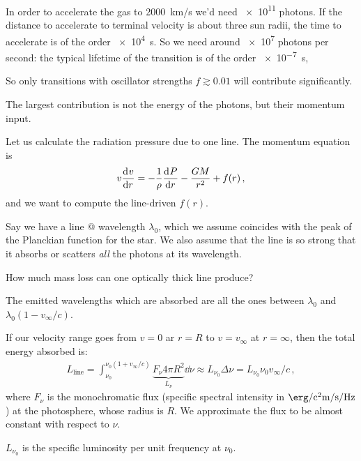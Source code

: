 \documentclass[main.tex]{subfiles}
\begin{document}
In order to accelerate the gas to \SI{2000}{km/s} we'd need \num{e11} photons.
If the distance to accelerate to terminal velocity is about three sun radii, the time to accelerate is of the order \SI{e4}{s}.
So we need around \num{e7} photons per second: the typical lifetime of the transition is of the order \SI{e-7}{s}, 

So only transitions with oscillator strengths \(f \gtrsim 0.01\) will contribute significantly.


The largest contribution is not the energy of the photons, but their momentum input.

Let us calculate the radiation pressure due to one line. The momentum equation is 
%
\begin{align}
  v \dv[]{v}{r} = - \frac{1}{\rho } \dv[]{P}{r} - \frac{GM}{r^2} + f(r)
\,,
\end{align}
%
and we want to compute the line-driven \(f(r)\).

Say we have a line @ wavelength \(\lambda_0 \),  which we assume coincides with the peak of the Planckian function for the star.
We also assume that the line is so strong that it absorbs or scatters \emph{all} the photons at its wavelength.


How much mass loss can one optically thick line produce? 

The emitted wavelengths which are absorbed are all the ones between \(\lambda_0\) and \(\lambda_0 (1 - v_{\infty}/c)\).

If our velocity range goes from \(v=0\) ar \(r = R\) to \(v = v_{\infty}\) at \(r = \infty\), then the total energy absorbed is: 
%
\begin{align}
  L _{\text{line}} = \int _{\nu_0 }^{\nu_0 (1 + v_{\infty}/c)} \underbrace{F_\nu 4 \pi R^2}_{{L_{\nu}}} \dd{\nu } \approx L_{\nu_0 } \Delta \nu = L_{\nu_0 } \nu_0 v_{\infty} /c
\,,
\end{align}
%
where \(F_{\nu }\) is the monochromatic flux (specific spectral intensity in \(\SI{}{\erg\per\square\centi\metre\per\second\per\hertz}\)) at the photosphere, whose radius is \(R\).
We approximate the flux to be almost constant with respect to \(\nu \).

\(L_{\nu_0 }\) is the specific luminosity per unit frequency at \(\nu_0 \).
\end{document}
